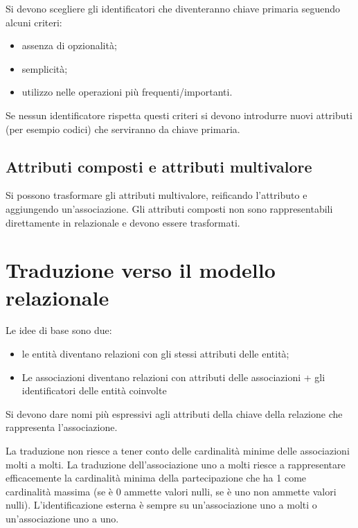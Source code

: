 Si devono scegliere gli identificatori che diventeranno chiave primaria seguendo alcuni criteri:

\begin{itemize}
    \item assenza di opzionalità;
    \item semplicità;
    \item utilizzo nelle operazioni più frequenti/importanti.
\end{itemize}

Se nessun identificatore rispetta questi criteri si devono introdurre nuovi attributi (per esempio codici) che serviranno da chiave primaria.

\subsection{Attributi composti e attributi multivalore}

Si possono trasformare gli attributi multivalore, reificando l’attributo e aggiungendo un’associazione. Gli attributi composti non sono rappresentabili direttamente in relazionale e devono essere trasformati.

\section{Traduzione verso il modello relazionale}

Le idee di base sono due:
\begin{itemize}
    \item le entità diventano relazioni con gli stessi attributi delle entità;
    \item Le associazioni diventano relazioni con attributi delle associazioni + gli identificatori delle entità coinvolte
\end{itemize}

Si devono dare nomi più espressivi agli attributi della chiave della relazione che rappresenta l’associazione. 

La traduzione non riesce a tener conto delle cardinalità minime delle associazioni molti a molti. La traduzione dell’associazione uno a molti riesce a rappresentare efficacemente la cardinalità minima della partecipazione che ha 1 come cardinalità massima (se è 0 ammette valori nulli, se è uno non ammette valori nulli). L’identificazione esterna è sempre su un’associazione uno a molti o un’associazione uno a uno.